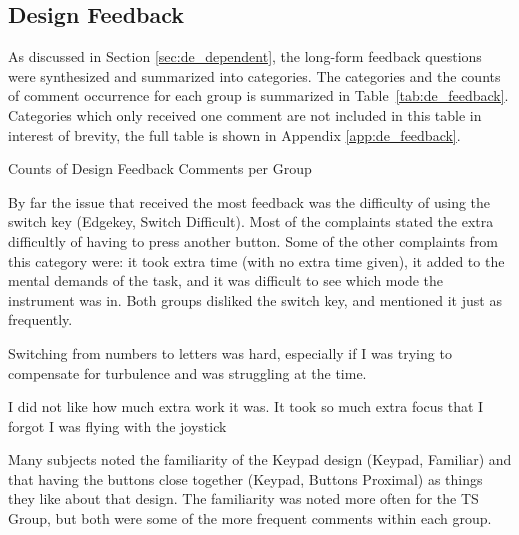 \subsection{Design Feedback}

As discussed in Section \autoref{sec:de_dependent}, the long-form feedback questions were synthesized and summarized into categories.
The categories and the counts of comment occurrence for each group is summarized in Table~\ref{tab:de_feedback}.
Categories which only received one comment are not included in this table in interest of brevity, the full table is shown in Appendix \autoref{app:de_feedback}.

\begin{table}
    \centering
    \caption{Counts of Design Feedback Comments per Group}
    \label{tab:de_feedback}
\end{table}

By far the issue that received the most feedback was the difficulty of using the switch key (Edgekey, Switch Difficult).
Most of the complaints stated the extra difficultly of having to press another button.
Some of the other complaints from this category were: it took extra time (with no extra time given), it added to the mental demands of the task, and it was difficult to see which mode the instrument was in.
Both groups disliked the switch key, and mentioned it just as frequently.
\begin{displayquote}[TS Subject]
    Switching from numbers to letters was hard, especially if I was trying to compensate for turbulence and was struggling at the time.
\end{displayquote}
\begin{displayquote}[VR Subject]
    I did not like how much extra work it was. It took so much extra focus that I forgot I was flying with the joystick
\end{displayquote}

Many subjects noted the familiarity of the Keypad design (Keypad, Familiar) and that having the buttons close together (Keypad, Buttons Proximal) as things they like about that design.
The familiarity was noted more often for the TS Group, but both were some of the more frequent comments within each group.

